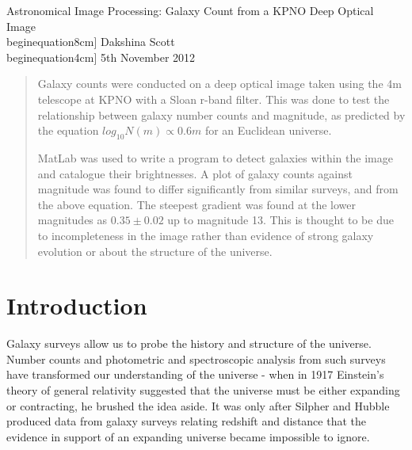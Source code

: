 \documentclass[a4paper,11pt,twoside]{article}
\begin{document}
\begin{titlepage}
\begin{center}

Astronomical Image Processing: Galaxy Count from a KPNO Deep Optical 
Image \\begin{equation}8cm]
Dakshina Scott \\begin{equation}4cm]
5th November 2012 \\

\end{center}
\end{titlepage}



\begin{abstract}

Galaxy counts were conducted on a deep optical image taken using the 
4m telescope at KPNO with a Sloan r-band filter. This was done to 
test the relationship between galaxy number counts and magnitude, 
as predicted by the equation \(log_{10} N(m) \propto 0.6m\) for an
Euclidean universe.

MatLab was used to write a program to detect galaxies within the 
image and catalogue their brightnesses. A plot of galaxy counts 
against magnitude was found to differ significantly from similar 
surveys, and from the above equation. The steepest gradient was 
found at the lower magnitudes as \(0.35 \pm 0.02\) up to magnitude 
13. This is thought to be due to incompleteness in the image rather 
than evidence of strong galaxy evolution or about the structure of 
the universe.

\end{abstract}


\tableofcontents


\section{Introduction}

Galaxy surveys allow us to probe the history and structure of the 
universe. Number counts and photometric and spectroscopic analysis 
from such surveys have transformed our understanding of the universe - 
when in 1917 Einstein's theory of general relativity suggested that 
the universe must be either expanding or contracting, he brushed the 
idea aside. It was only after Silpher and Hubble produced data from 
galaxy surveys relating redshift and distance that the evidence in 
support of an expanding universe became impossible to ignore\cite{raine}.
\end{document}
